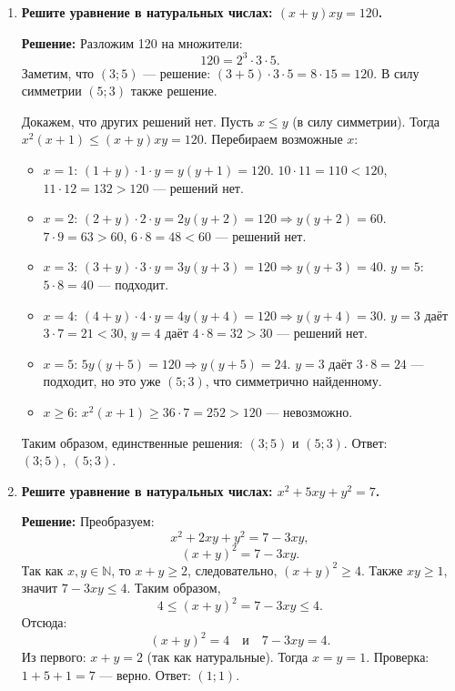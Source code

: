 \documentclass[12pt, a4paper]{article}
\begin{document}
\begin{enumerate}[label=\arabic*., wide=0pt, leftmargin=*]
\item \textbf{Решите уравнение в натуральных числах: \((x + y)xy = 120\).}

\textbf{Решение:}
Разложим 120 на множители:
\[
120 = 2^3 \cdot 3 \cdot 5.
\]
Заметим, что \((3;5)\) — решение: \((3+5)\cdot3\cdot5 = 8 \cdot 15 = 120\). В силу симметрии \((5;3)\) также решение.

Докажем, что других решений нет. Пусть \(x \le y\) (в силу симметрии). Тогда \(x^2(x+1) \le (x+y)xy = 120\). Перебираем возможные \(x\):
\begin{itemize}
\item \(x = 1\): \((1+y)\cdot1\cdot y = y(y+1) = 120\). \(10 \cdot 11 = 110 < 120\), \(11 \cdot 12 = 132 > 120\) — решений нет.
\item \(x = 2\): \((2+y)\cdot2\cdot y = 2y(y+2) = 120 \Rightarrow y(y+2) = 60\). \(7 \cdot 9 = 63 > 60\), \(6 \cdot 8 = 48 < 60\) — решений нет.
\item \(x = 3\): \((3+y)\cdot3\cdot y = 3y(y+3) = 120 \Rightarrow y(y+3) = 40\). \(y=5\): \(5 \cdot 8 = 40\) — подходит.
\item \(x = 4\): \((4+y)\cdot4\cdot y = 4y(y+4) = 120 \Rightarrow y(y+4) = 30\). \(y=3\) даёт \(3\cdot7 = 21 < 30\), \(y=4\) даёт \(4\cdot8 = 32 > 30\) — решений нет.
\item \(x = 5\): \(5y(y+5) = 120 \Rightarrow y(y+5) = 24\). \(y=3\) даёт \(3\cdot8 = 24\) — подходит, но это уже \((5;3)\), что симметрично найденному.
\item \(x \ge 6\): \(x^2(x+1) \ge 36 \cdot 7 = 252 > 120\) — невозможно.
\end{itemize}
Таким образом, единственные решения: \((3;5)\) и \((5;3)\).
Ответ: \((3;5),\; (5;3)\).

\item \textbf{Решите уравнение в натуральных числах: \(x^2 + 5xy + y^2 = 7\).}

\textbf{Решение:}
Преобразуем:
\[
x^2 + 2xy + y^2 = 7 - 3xy,
\]
\[
(x+y)^2 = 7 - 3xy.
\]
Так как \(x, y \in \mathbb{N}\), то \(x+y \ge 2\), следовательно, \((x+y)^2 \ge 4\). Также \(xy \ge 1\), значит \(7 - 3xy \le 4\). Таким образом,
\[
4 \le (x+y)^2 = 7 - 3xy \le 4.
\]
Отсюда:
\[
(x+y)^2 = 4 \quad\text{и}\quad 7 - 3xy = 4.
\]
Из первого: \(x+y = 2\) (так как натуральные). Тогда \(x = y = 1\). Проверка: \(1 + 5 + 1 = 7\) — верно.
Ответ: \((1;1)\).

\end{enumerate}
\end{document}
